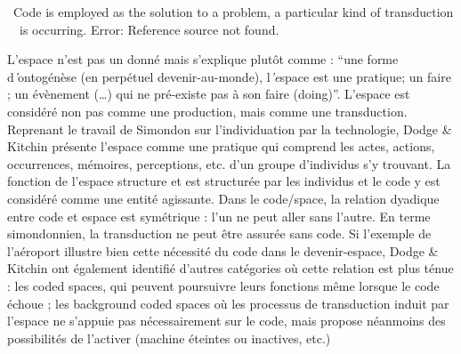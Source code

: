 \bigskip

{\color{black}
{\guillemotleft}~Code is employed as the solution to a problem, a particular kind of transduction \ \ is
occurring.{\guillemotright} Error: Reference source not found. }


\bigskip

{\color{black}
L'espace n'est pas un donn\'e mais s'explique plut\^ot comme : ``une forme d\textit{{}'}ontog\'en\`ese (en perp\'etuel
devenir-au-monde), l\textit{{}'e}space est une pratique; un faire ; un \'ev\`enement ({\dots}) qui ne pr\'e-existe pas
\`a son faire (doing)''. L'espace est consid\'er\'e non pas comme une production, mais comme une transduction.
Reprenant le travail de Simondon sur l'individuation par la technologie, Dodge \& Kitchin pr\'esente l'espace comme une
pratique qui comprend les actes, actions, occurrences, m\'emoires, perceptions, etc. d'un groupe d'individus s'y
trouvant. La fonction de l'espace structure et est structur\'ee par les individus et le code y est consid\'er\'e comme
une entit\'e agissante. Dans le code/space, la relation dyadique entre code et espace est sym\'etrique : l'un ne peut
aller sans l'autre. En terme simondonnien, la transduction ne peut \^etre assur\'ee sans code. Si l'exemple de
l'a\'eroport illustre bien cette n\'ecessit\'e du code dans le devenir-espace, Dodge \& Kitchin ont \'egalement
identifi\'e d'autres cat\'egories o\`u cette relation est plus t\'enue : les coded spaces, qui peuvent poursuivre leurs
fonctions m\^eme lorsque le code \'echoue ; les background coded spaces o\`u les processus de transduction induit par
l'espace ne s'appuie pas n\'ecessairement sur le code, mais propose n\'eanmoins des possibilit\'es de l'activer
(machine \'eteintes ou inactives, etc.) }


\bigskip

